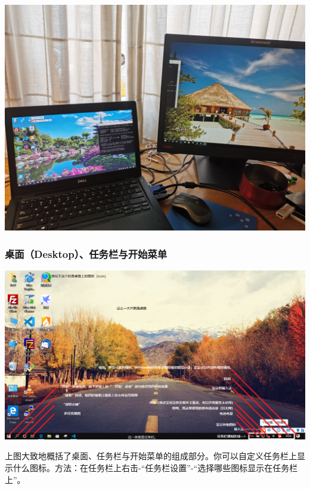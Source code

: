 \begin{center}
	\includegraphics[scale=0.15]{pic/ScrExtend}
\end{center} 
\subsubsection{桌面（Desktop）、任务栏与开始菜单}
\begin{center}
	\includegraphics[scale=0.7,angle=90]{pic/screenIntro}
\end{center} \par
上图大致地概括了桌面、任务栏与开始菜单的组成部分。你可以自定义任务栏上显示什么图标。方法：在任务栏上右击-“任务栏设置”-“选择哪些图标显示在任务栏上”。
